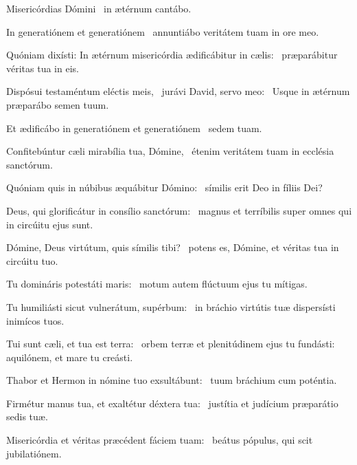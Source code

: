 \item Misericórdias Dómini~\psstar{} in ætérnum cantábo.

\item In generatiónem et generatiónem~\psstar{} annuntiábo veritátem tuam in ore meo.

\item Quóniam dixísti: In ætérnum misericórdia ædificábitur in cælis:~\psstar{} præparábitur véritas tua in eis.

\item Dispósui testaméntum eléctis meis,~\pscross{} jurávi David, servo meo:~\psstar{} Usque in ætérnum præparábo semen tuum.

\item Et ædificábo in generatiónem et generatiónem~\psstar{} sedem tuam.

\item Confitebúntur cæli mirabília tua, Dómine,~\psstar{} étenim veritátem tuam in ecclésia sanctórum.

\item Quóniam quis in núbibus æquábitur Dómino:~\psstar{} símilis erit Deo in fíliis Dei?

\item Deus, qui glorificátur in consílio sanctórum:~\psstar{} magnus et terríbilis super omnes qui in circúitu ejus sunt.

\item Dómine, Deus virtútum, quis símilis tibi?~\psstar{} potens es, Dómine, et véritas tua in circúitu tuo.

\item Tu domináris potestáti maris:~\psstar{} motum autem flúctuum ejus tu mítigas.

\item Tu humiliásti sicut vulnerá\-tum, supérbum:~\psstar{} in bráchio virtútis tuæ dispersísti inimícos tuos.

\item Tui sunt cæli, et tua est terra:~\pscross{} orbem terræ et plenitúdinem ejus tu fundásti:~\psstar{} aquilónem, et mare tu creásti.

\item Thabor et Hermon in nómine tuo exsultábunt:~\psstar{} tuum bráchium cum poténtia.

\item Firmétur manus tua, et exaltétur déxtera tua:~\psstar{} justítia et judícium præparátio sedis tuæ.

\item Misericórdia et véritas præcédent fáciem tuam:~\psstar{} beátus pópulus, qui scit jubilatiónem.


